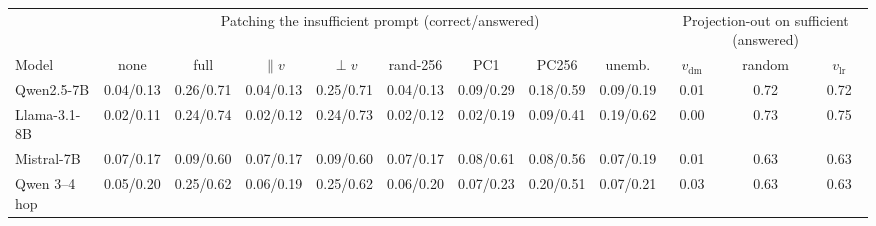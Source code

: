 \begin{tabular}{lccccccccccc}
\toprule
& \multicolumn{8}{c}{Patching the insufficient prompt (correct/answered)} & \multicolumn{3}{c}{Projection-out on sufficient (answered)} \\
\cmidrule(lr){2-9}\cmidrule(lr){10-12}
Model & none & full & $\parallel v$ & $\perp v$ & rand-256 & PC1 & PC256 & unemb. & $v_{\mathrm{dm}}$ & random & $v_{\mathrm{lr}}$ \\
\midrule
Qwen2.5-7B & 0.04/0.13 & 0.26/0.71 & 0.04/0.13 & 0.25/0.71 & 0.04/0.13 & 0.09/0.29 & 0.18/0.59 & 0.09/0.19 & 0.01 & 0.72 & 0.72 \\
Llama-3.1-8B & 0.02/0.11 & 0.24/0.74 & 0.02/0.12 & 0.24/0.73 & 0.02/0.12 & 0.02/0.19 & 0.09/0.41 & 0.19/0.62 & 0.00 & 0.73 & 0.75 \\
Mistral-7B & 0.07/0.17 & 0.09/0.60 & 0.07/0.17 & 0.09/0.60 & 0.07/0.17 & 0.08/0.61 & 0.08/0.56 & 0.07/0.19 & 0.01 & 0.63 & 0.63 \\
Qwen 3--4 hop & 0.05/0.20 & 0.25/0.62 & 0.06/0.19 & 0.25/0.62 & 0.06/0.20 & 0.07/0.23 & 0.20/0.51 & 0.07/0.21 & 0.03 & 0.63 & 0.63 \\
\bottomrule
\end{tabular}